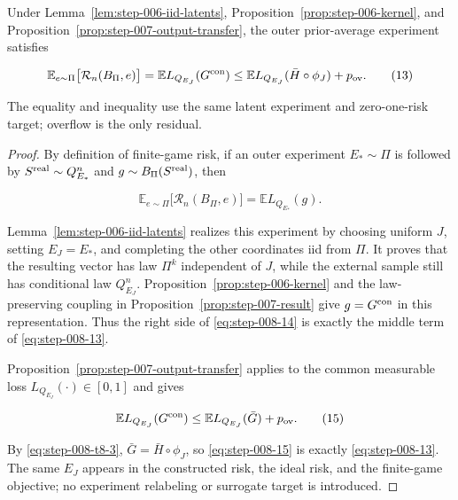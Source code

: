 \begin{proposition}
\label{prop:step-008-transfer}

Under Lemma~\ref{lem:step-006-iid-latents},
Proposition~\ref{prop:step-006-kernel}, and
Proposition~\ref{prop:step-007-output-transfer}, the outer
prior-average experiment satisfies

\[
\mathbb E_{e\sim\Pi}\bigl[\mathcal R_n(B_\Pi,e)\bigr]
=\mathbb E L_{Q_{E_J}}(G^{\rm con})
\le
\mathbb E L_{Q_{E_J}}(\bar H\circ\phi_J)+p_{\rm ov}.
\tag{13}\label{eq:step-008-13}
\]

The equality and inequality use the same latent experiment and
zero-one-risk target; overflow is the only residual.

\end{proposition}

\begin{proof}

By definition of finite-game risk, if an outer experiment
\(E_*\sim\Pi\) is followed by
\(S^{\rm real}\sim Q_{E_*}^n\) and
\(g\sim B_\Pi(S^{\rm real})\), then

\[
\mathbb E_{e\sim\Pi}\bigl[\mathcal R_n(B_\Pi,e)\bigr]
=\mathbb E L_{Q_{E_*}}(g).
\tag{14}\label{eq:step-008-14}
\]

Lemma~\ref{lem:step-006-iid-latents} realizes this experiment
by choosing uniform \(J\), setting \(E_J=E_*\), and completing the
other coordinates iid from \(\Pi\).  It proves that the resulting
vector has law \(\Pi^k\) independent of \(J\), while the external
sample still has conditional law \(Q_{E_J}^n\).  
Proposition~\ref{prop:step-006-kernel} and the law-preserving coupling
in Proposition~\ref{prop:step-007-result} give \(g=G^{\rm con}\) in this representation.  Thus
the right side of \eqref{eq:step-008-14} is exactly the middle term of \eqref{eq:step-008-13}.

Proposition~\ref{prop:step-007-output-transfer} applies to
the common measurable loss
\(L_{Q_{E_J}}(\cdot)\in[0,1]\) and gives

\[
\mathbb E L_{Q_{E_J}}(G^{\rm con})
\le\mathbb E L_{Q_{E_J}}(\bar G)+p_{\rm ov}.
\tag{15}\label{eq:step-008-15}
\]

By \eqref{eq:step-008-t8-3},
\(\bar G=\bar H\circ\phi_J\), so \eqref{eq:step-008-15} is exactly \eqref{eq:step-008-13}.  The same
\(E_J\) appears in the constructed risk, the ideal risk, and the
finite-game objective; no experiment relabeling or surrogate target
is introduced.

\end{proof}


